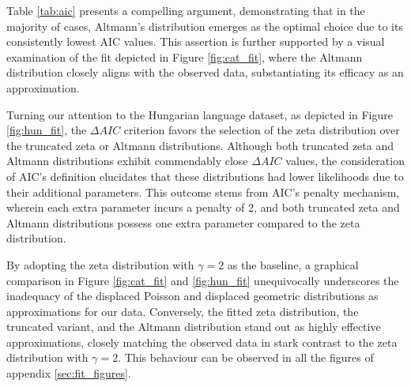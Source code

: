 \documentclass{article}
\begin{document}


Table \ref{tab:aic} presents a compelling argument, demonstrating that in the majority of cases, Altmann's distribution emerges as the optimal choice due to its consistently lowest AIC values. This assertion is further supported by a visual examination of the fit depicted in Figure \ref{fig:cat_fit}, where the Altmann distribution closely aligns with the observed data, substantiating its efficacy as an approximation.

Turning our attention to the Hungarian language dataset, as depicted in Figure \ref{fig:hun_fit}, the $\Delta AIC$ criterion favors the selection of the zeta distribution over the truncated zeta or Altmann distributions. Although both truncated zeta and Altmann distributions exhibit commendably close $\Delta AIC$ values, the consideration of AIC's definition elucidates that these distributions had lower likelihoods due to their additional parameters. This outcome stems from AIC's penalty mechanism, wherein each extra parameter incurs a penalty of 2, and both truncated zeta and Altmann distributions possess one extra parameter compared to the zeta distribution.

By adopting the zeta distribution with $\gamma = 2$ as the baseline, a graphical comparison in Figure \ref{fig:cat_fit} and \ref{fig:hun_fit} unequivocally underscores the inadequacy of the displaced Poisson and displaced geometric distributions as approximations for our data. Conversely, the fitted zeta distribution, the truncated variant, and the Altmann distribution stand out as highly effective approximations, closely matching the observed data in stark contrast to the zeta distribution with $\gamma = 2$. This behaviour can be observed in all the figures of appendix \ref{sec:fit_figures}.
\end{document}
